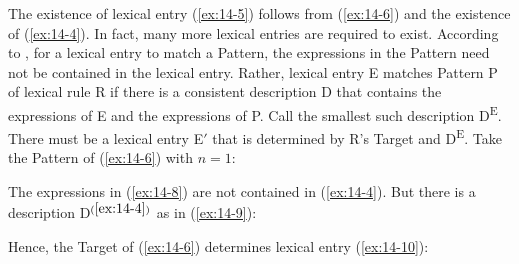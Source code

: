 \documentclass[output=paper]{LSP/langsci}
\begin{document}
\addlines[2]
\randnum\label{rn:14-17}The existence of lexical entry (\ref{ex:14-5}) follows
from (\ref{ex:14-6}) and the existence of (\ref{ex:14-4}). In fact, many more lexical entries
are required to exist. According to \citet{PollardSagE1994}, for a lexical entry to match
a Pattern, the expressions in the Pattern need not be contained in the
lexical entry. Rather, lexical entry E matches Pattern P of lexical
rule R if there is a consistent description D that contains the
expressions of E and the expressions of P. Call the smallest such
description D\textsuperscript{E}. There must be a lexical entry E$'$ that is determined
by R's Target and D\textsuperscript{E}. Take the Pattern of (\ref{ex:14-6}) with $n = 1$:
\begin{exe}
\ex
\label{ex:14-8}
\end{exe}
The expressions in (\ref{ex:14-8}) are not contained in (\ref{ex:14-4}). But there is a description D$^{(\ref{ex:14-4})}$ as in (\ref{ex:14-9}):
\begin{exe}
\ex
\label{ex:14-9}
\end{exe}
Hence, the Target of (\ref{ex:14-6}) determines lexical entry (\ref{ex:14-10}):
\end{document}
